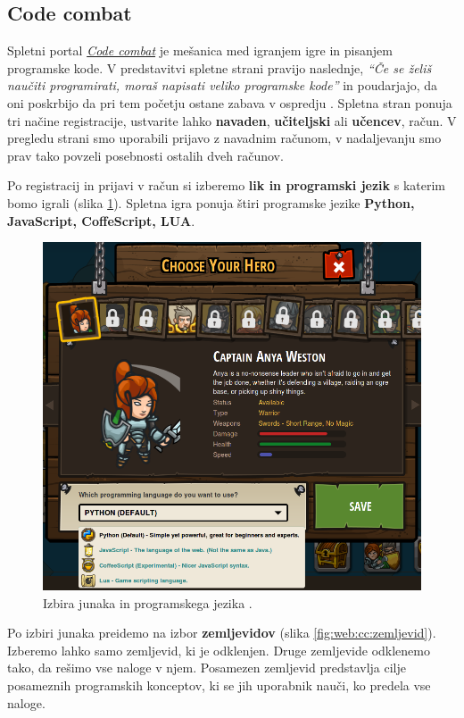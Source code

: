 \subsection{Code combat}
\label{sec:code_battle}

Spletni portal \emph{\href{https://codecombat.com/}{Code combat}}
\cite{web:codecombat} je mešanica med igranjem igre in pisanjem
programske kode. V predstavitvi spletne strani pravijo naslednje,
\emph{``Če se želiš naučiti programirati, moraš napisati veliko
  programske kode''} in poudarjajo, da oni poskrbijo da pri tem
početju ostane zabava v ospredju \cite{web:codecombat:about}. Spletna
stran ponuja tri načine registracije, ustvarite lahko
\textbf{navaden}, \textbf{učiteljski} ali \textbf{učencev}, račun. V
pregledu strani smo uporabili prijavo z navadnim računom, v
nadaljevanju smo prav tako povzeli posebnosti ostalih dveh računov.

Po registracij in prijavi v račun si izberemo \textbf{lik in
  programski jezik} s katerim bomo igrali (slika
\ref{fig:web:cc:hero}). Spletna igra ponuja štiri programske jezike
\textbf{Python, JavaScript, CoffeScript, LUA}. 

\begin{figure}[h!]
  \centering
    \includegraphics [width=0.45\linewidth, keepaspectratio =
   1] {./images/sc_web/cc_hero-lang-v01.png}
   \caption{Izbira junaka in programskega jezika \cite{web:codecombat}.}
   \label{fig:web:cc:hero}
 \end{figure}


 Po izbiri junaka preidemo na izbor \textbf{zemljevidov} (slika
 \ref{fig:web:cc:zemljevid}). Izberemo lahko samo zemljevid, ki je
 odklenjen. Druge zemljevide odklenemo tako, da rešimo vse naloge v
 njem. Posamezen zemljevid predstavlja cilje posameznih programskih
 konceptov, ki se jih uporabnik nauči, ko predela vse naloge.

